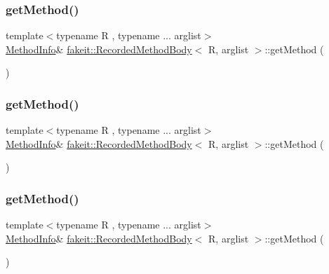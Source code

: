 \subsubsection{\texorpdfstring{getMethod()}{getMethod()}\hspace{0.1cm}{\footnotesize\ttfamily [3/9]}}
{\footnotesize\ttfamily template$<$typename R , typename ... arglist$>$ \\
\mbox{\hyperlink{structfakeit_1_1MethodInfo}{Method\+Info}}\& \mbox{\hyperlink{classfakeit_1_1RecordedMethodBody}{fakeit\+::\+Recorded\+Method\+Body}}$<$ R, arglist $>$\+::get\+Method (\begin{DoxyParamCaption}{ }\end{DoxyParamCaption})\hspace{0.3cm}{\ttfamily [inline]}}

\mbox{\label{classfakeit_1_1RecordedMethodBody_a12e45d3948ebf9e8b3e16f704fd16503}} 
\subsubsection{\texorpdfstring{getMethod()}{getMethod()}\hspace{0.1cm}{\footnotesize\ttfamily [4/9]}}
{\footnotesize\ttfamily template$<$typename R , typename ... arglist$>$ \\
\mbox{\hyperlink{structfakeit_1_1MethodInfo}{Method\+Info}}\& \mbox{\hyperlink{classfakeit_1_1RecordedMethodBody}{fakeit\+::\+Recorded\+Method\+Body}}$<$ R, arglist $>$\+::get\+Method (\begin{DoxyParamCaption}{ }\end{DoxyParamCaption})\hspace{0.3cm}{\ttfamily [inline]}}

\mbox{\label{classfakeit_1_1RecordedMethodBody_a12e45d3948ebf9e8b3e16f704fd16503}} 
\subsubsection{\texorpdfstring{getMethod()}{getMethod()}\hspace{0.1cm}{\footnotesize\ttfamily [5/9]}}
{\footnotesize\ttfamily template$<$typename R , typename ... arglist$>$ \\
\mbox{\hyperlink{structfakeit_1_1MethodInfo}{Method\+Info}}\& \mbox{\hyperlink{classfakeit_1_1RecordedMethodBody}{fakeit\+::\+Recorded\+Method\+Body}}$<$ R, arglist $>$\+::get\+Method (\begin{DoxyParamCaption}{ }\end{DoxyParamCaption})\hspace{0.3cm}{\ttfamily [inline]}}

